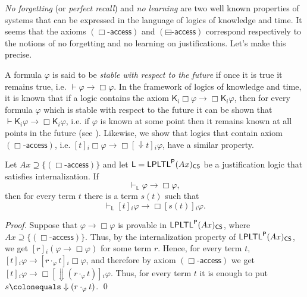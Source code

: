 \documentclass[envcountsect,envcountsame,oribibl,orivec]{llncs}
\newcommand{\limplies}{\rightarrow}
\newcommand{\lalways}{\Box}
\newcommand{\lsofar}{\boxminus}
\newcommand{\LPLTLp}{\textsf{LPLTL}^{\sf P}}
\newcommand{\lknows}{\mathsf{K}}
\newcommand{\jbox}[1]{\left[#1\right]\!}
\newcommand{\talwaysaccess}{\Downarrow}
\newcommand{\CS}{\textsf{CS}}
\newcommand{\agent}{i}
\newcommand{\alwaysaccessprinciple}{\ensuremath{(\lalways\textsf{-access})}}
\newcommand{\pastaccessprinciple}{\ensuremath{(\lsofar\textsf{-access})}}
\renewcommand{\phi}{\varphi}
\begin{document}
\textit{No forgetting} (or \textit{perfect recall}) and \textit{no learning} are two well known properties of systems that can be expressed in the language of logics of knowledge and time. It seems that the axioms $\alwaysaccessprinciple$ and $\pastaccessprinciple$ correspond respectively to the notions of no forgetting and no learning on justifications. Let’s make this precise. 

A formula $\phi$ is said to be \textit{stable with respect to the future} if once it is true it remains true, i.e. $\vdash \phi \to \lalways \phi$. In the framework of logics of knowledge and time, it is known that if a logic contains the axiom $\lknows_\agent \lalways \phi \limplies \lalways \lknows_\agent \phi$, then for every formula $\phi$ which is  stable with respect to the future it can be shown that $\vdash \lknows_\agent \phi \to \lalways \lknows_\agent \phi$, i.e. if $\phi$ is known at some point then it remains known at all points in the future (see \cite{FHMV95}). Likewise, we show that logics that contain axiom $\alwaysaccessprinciple$, i.e. $\jbox{t}_\agent \lalways \phi \limplies \lalways \jbox{\talwaysaccess t}_\agent \phi$, have a similar property.

\begin{theorem}\label{thm: alwaysaccess principle-no forgetting}
	Let $Ax \supseteq \{\alwaysaccessprinciple\}$ and let $\mathsf{L} = \LPLTLp(Ax)_\CS$ be a justification logic that satisfies internalization. If 
	\[
	\vdash_\mathsf{L} \phi \to \lalways \phi,
	\]
	then for every term $t$ there is a term $s(t)$ such that
	\[
	\vdash_\mathsf{L} \jbox{t}_\agent \phi \to \lalways \jbox{s(t)}_\agent \phi.
	\]
\end{theorem}
\begin{proof}
	Suppose that $\phi \to \lalways \phi$ is provable in $\LPLTLp(Ax)_\CS$, where $Ax \supseteq \{\alwaysaccessprinciple\}$. Thus, by the internalization property of $\LPLTLp(Ax)_\CS$, we get $\jbox{r}_\agent (\phi \to \lalways \phi)$  for some term $r$. Hence, for every term $t$, $\jbox{t}_\agent \phi \to \jbox{r \cdot_\phi t}_\agent \lalways \phi$, and therefore by axiom $\alwaysaccessprinciple$ we get $\jbox{t}_\agent \phi \to \lalways  \jbox{\talwaysaccess (r \cdot_\phi t)}_\agent \phi$. Thus, for every term $t$ it is enough to put $s \colonequals \talwaysaccess (r \cdot_\phi t)$. \qed 
\end{proof}
\end{document}
